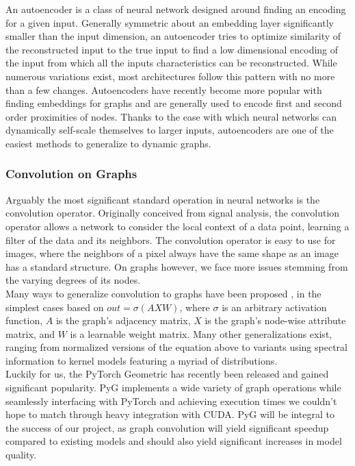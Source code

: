 \documentclass[12pt,twoside]{report}
\begin{document}
An autoencoder is a class of neural network designed around finding an encoding for a given input. Generally symmetric about an embedding layer significantly smaller than the input dimension, an autoencoder tries to optimize similarity of the reconstructed input to the true input to find a low dimensional encoding of the input from which all the inputs characteristics can be reconstructed. While numerous variations exist, most architectures follow this pattern with no more than a few changes. Autoencoders have recently become more popular with finding embeddings for graphs and are generally used to encode first and second order proximities of nodes. Thanks to the ease with which neural networks can dynamically self-scale themselves to larger inputs, autoencoders are one of the easiest methods to generalize to dynamic graphs. \\

\subsubsection{Convolution on Graphs}

Arguably the most significant standard operation in neural networks is the convolution operator. Originally conceived from signal analysis, the convolution operator allows a network to consider the local context of a data point, learning a filter of the data and its neighbors. The convolution operator is easy to use for images, where the neighbors of a pixel always have the same shape as an image has a standard structure.  On graphs however, we face more issues stemming from the varying degrees of its nodes. \\

Many ways to generalize convolution to graphs have been proposed \cite{wu2019comprehensive}, in the simplest cases based on $out = \sigma (AXW)$, where $\sigma$ is an arbitrary activation function, $A$ is the graph's adjacency matrix, $X$ is the graph's node-wise attribute matrix, and $W$ is a learnable weight matrix. Many other generalizations exist, ranging from normalized versions of the equation above to variants using spectral information to kernel models featuring a myriad of distributions. \\

Luckily for us, the PyTorch Geometric \cite{Fey/Lenssen/2019} has recently been released and gained significant popularity. PyG implements a wide variety of graph operations while seamlessly interfacing with PyTorch and achieving execution times we couldn't hope to match through heavy integration with CUDA. PyG will be integral to the success of our project, as graph convolution will yield significant speedup compared to existing models and should also yield significant increases in model quality. \\
\end{document}
